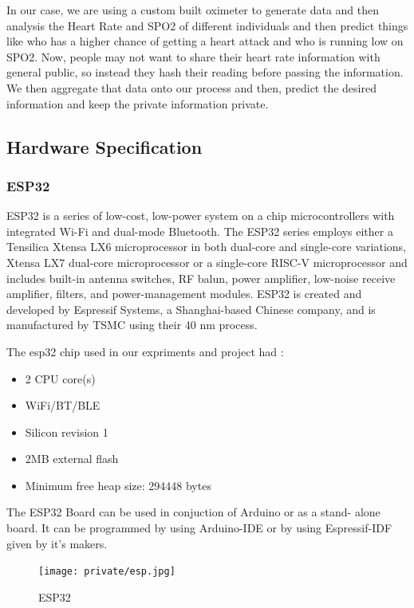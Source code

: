 \documentclass[14pt]{extarticle}
\begin{document}
\par In our case, we are using a custom built oximeter to generate data and then analysis the
Heart Rate and SPO2 of different individuals and then predict things like who has a higher
chance of getting a heart attack and who is running low on SPO2. Now, people may not
want to share their heart rate information with general public, so instead they hash their
reading before passing the information. We then aggregate that data onto our process and
then, predict the desired information and keep the private information private.

\newpage
\subsection{Hardware Specification}
\subsubsection{ESP32}
\singlespacing

\par ESP32 is a series of low-cost, low-power system on a chip microcontrollers with integrated Wi-Fi and dual-mode Bluetooth. The ESP32 series employs either a Tensilica Xtensa LX6 microprocessor in both dual-core and single-core variations, Xtensa LX7 dual-core microprocessor or a single-core RISC-V microprocessor and includes built-in antenna switches, RF balun, power amplifier, low-noise receive amplifier, filters, and power-management modules. ESP32 is created and developed by Espressif Systems, a Shanghai-based Chinese company, and is manufactured by TSMC using their 40 nm process.

The esp32 chip used in our expriments and project had :
\begin{itemize}
    \item 2 CPU core(s)
    \item WiFi/BT/BLE
    \item Silicon revision 1
    \item 2MB external flash
    \item Minimum free heap size: 294448 bytes
\end{itemize}

The ESP32 Board can be used in conjuction of Arduino or as a stand- alone board. It can be programmed by using Arduino-IDE or by using Espressif-IDF given by it's makers.

\begin{figure}[!h]
    \centering
    \texttt{[image: private/esp.jpg]}
    \caption{ESP32}
    \label{fig:esp}
\end{figure}
\end{document}
